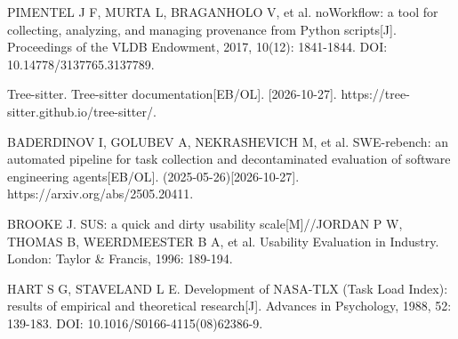 {\begin{tjreflist}
\item PIMENTEL J F, MURTA L, BRAGANHOLO V, et al. noWorkflow: a tool for collecting, analyzing, and managing provenance from Python scripts[J]. Proceedings of the VLDB Endowment, 2017, 10(12): 1841-1844. DOI: 10.14778/3137765.3137789.
\item Tree-sitter. Tree-sitter documentation[EB/OL]. [2026-10-27]. https://tree-sitter.github.io/tree-sitter/.
\item BADERDINOV I, GOLUBEV A, NEKRASHEVICH M, et al. SWE-rebench: an automated pipeline for task collection and decontaminated evaluation of software engineering agents[EB/OL]. (2025-05-26)[2026-10-27]. https://arxiv.org/abs/2505.20411.
\item BROOKE J. SUS: a quick and dirty usability scale[M]//JORDAN P W, THOMAS B, WEERDMEESTER B A, et al. Usability Evaluation in Industry. London: Taylor \& Francis, 1996: 189-194.
\item HART S G, STAVELAND L E. Development of NASA-TLX (Task Load Index): results of empirical and theoretical research[J]. Advances in Psychology, 1988, 52: 139-183. DOI: 10.1016/S0166-4115(08)62386-9.
\end{tjreflist}
}

\newpage
{}

\begin{tjreviewbox}

  \vspace{8\baselineskip}
\end{tjreviewbox}

\begin{tjreviewbox}

  \vspace{6\baselineskip}
\end{tjreviewbox}
